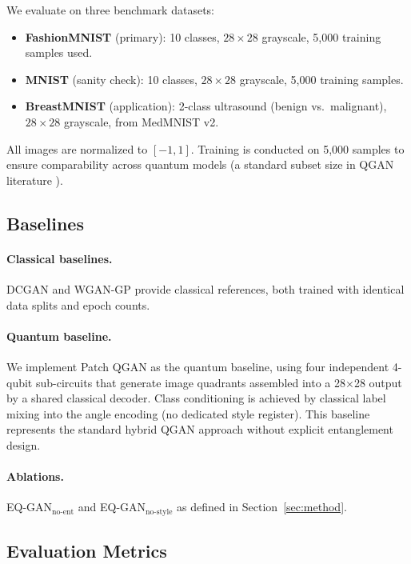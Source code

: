 \documentclass[twocolumn]{article}
\begin{document}
We evaluate on three benchmark datasets:
\begin{itemize}
  \item \textbf{FashionMNIST} \cite{xiao2017fashion} (primary): 10 classes,
    $28\times28$ grayscale, 5{,}000 training samples used.
  \item \textbf{MNIST} \cite{lecun1998gradient} (sanity check): 10 classes,
    $28\times28$ grayscale, 5{,}000 training samples.
  \item \textbf{BreastMNIST} \cite{medmnistv2} (application): 2-class
    ultrasound (benign vs.\ malignant), $28\times28$ grayscale, from
    MedMNIST v2.
\end{itemize}
All images are normalized to $[-1, 1]$. Training is conducted on 5{,}000
samples to ensure comparability across quantum models (a standard subset size
in QGAN literature \cite{huang2021experimental, tsang2023mosaiq}).

\subsection{Baselines}

\paragraph{Classical baselines.}
DCGAN \cite{radford2015unsupervised} and WGAN-GP \cite{gulrajani2017improved}
provide classical references, both trained with identical data splits and
epoch counts.

\paragraph{Quantum baseline.}
We implement Patch QGAN \cite{huang2021experimental} as the quantum baseline,
using four independent 4-qubit sub-circuits that generate image quadrants
assembled into a 28$\times$28 output by a shared classical decoder.
Class conditioning is achieved by classical label mixing into the angle
encoding (no dedicated style register). This baseline represents the
standard hybrid QGAN approach without explicit entanglement design.

\paragraph{Ablations.}
EQ-GAN$_\text{no-ent}$ and EQ-GAN$_\text{no-style}$ as defined in
Section~\ref{sec:method}.

\subsection{Evaluation Metrics}
\end{document}
